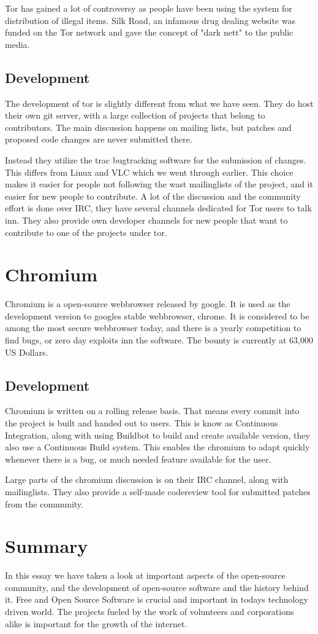 \documentclass[12pt]{article}
\begin{document}
Tor has gained a lot of controversy as people have been using the system for
distribution of illegal items. Silk Road, an infamous drug dealing website was
funded on the Tor network and gave the concept of "dark nett" to the public
media.

\subsection{Development}
The development of tor is slightly different from what we have seen. They do
host their own git server, with a large collection of projects that belong to
contributors. The main discussion happens on mailing lists, but patches and
proposed code changes are never submitted there.

Instead they utilize the trac bugtracking software for the submission of
changes. This differs from Linux and VLC which we went through earlier. This
choice makes it easier for people not following the wast mailinglists of the
project, and it easier for new people to contribute. A lot of the discussion and
the community effort is done over IRC, they have several channels dedicated for
Tor users to talk inn. They also provide own developer channels for new people
that want to contribute to one of the projects under tor.


\section{Chromium}
Chromium is a open-source webbrowser released by google. It is used as the
development version to googles stable webbrowser, chrome. It is considered to be
among the most secure webbrowser today, and there is a yearly competition to
find bugs, or zero day exploits inn the software. The bounty is currently at
63,000 US Dollars\cite{pwn2own}.

\subsection{Development}
Chromium is written on a rolling release basis. That means every commit into the
project is built and handed out to users. This is know as Continuous
Integration, along with using Buildbot to build and create available version,
they also use a Continuous Build system. This enables the chromium to adapt
quickly whenever there is a bug, or much needed feature available for the user.

Large parts of the chromium discussion is on their IRC channel, along with
mailinglists. They also provide a self-made codereview tool for submitted
patches from the community.


\section{Summary}
In this essay we have taken a look at important aspects of the open-source
community, and the development of open-source software and the history behind
it. Free and Open Source Software is crucial and important in todays technology
driven world. The projects fueled by the work of volunteers and corporations
alike is important for the growth of the internet.

\clearpage


\end{document}
